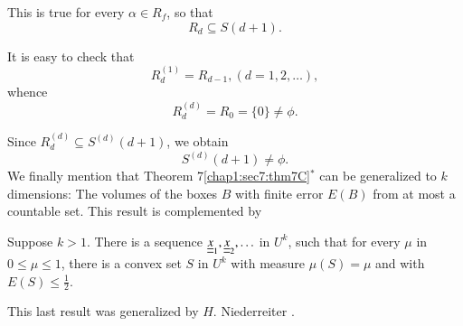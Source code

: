 This is true for every $\alpha \in R_{f}$, so that
$$
R_{d} \subseteq S(d + 1).
$$

It is easy to check that
$$
R_{d}^{(1)} = R_{d-1}, (d = 1, 2, \ldots),
$$
whence
$$
R_{d}^{(d)} = R_{0} = \{0\} \neq \phi.
$$

Since $R_{d}^{(d)} \subseteq S^{(d)} (d+1)$, we obtain
$$
S^{(d)} (d+1) \neq \phi.
$$
\label{55}
We finally mention that Theorem 7\ref{chap1:sec7:thm7C}$^{*}$ can be generalized to $k$ dimensions: The volumes of the boxes $B$ with finite error $E(B)$ from at most a countable set. This result is complemented by
\begin{theorem}[$^*$]\label{chap1:sec7:thm7I}
Suppose $k > 1$. There is a sequence $\underline{\underline{x}}_{1}, \underline{\underline{x}}_{2}, \ldots$ in $U^{k}$, 
such that for every $\mu$ in $0 \leq \mu \leq 1$, there is a convex set $S$ in $U^{k}$ with measure $\mu(S) = \mu$ and with $E(S) \leq \frac{1}{2}$.
\end{theorem}

This last result was generalized by $H$. Niederreiter \cite{15}.


